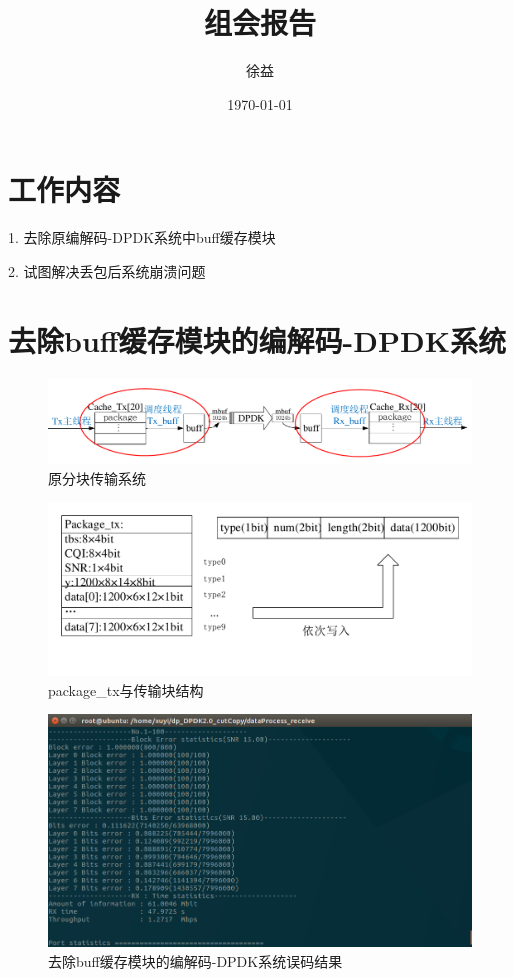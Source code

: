 \documentclass{article}
\title{组会报告}
\author{徐益}
\date{\today}
\begin{document}
\maketitle


\section{工作内容}

1. 去除原编解码-DPDK系统中buff缓存模块

2. 试图解决丢包后系统崩溃问题

\section{去除buff缓存模块的编解码-DPDK系统}


\begin{figure}[H]
	\centering
	\includegraphics[width = \textwidth]{frame_sys_copy.pdf}
	\caption{原分块传输系统}
\end{figure}
\begin{figure}[H]
	\centering
	\includegraphics[width = \textwidth]{straight_write_frame.pdf}
	\caption{package\_tx与传输块结构}
\end{figure}
\begin{figure}[H]
	\centering
	\includegraphics[width = .8\textwidth]{dp2_cutcopy_result.png}
	\caption{去除buff缓存模块的编解码-DPDK系统误码结果}
\end{figure}
\end{document}
